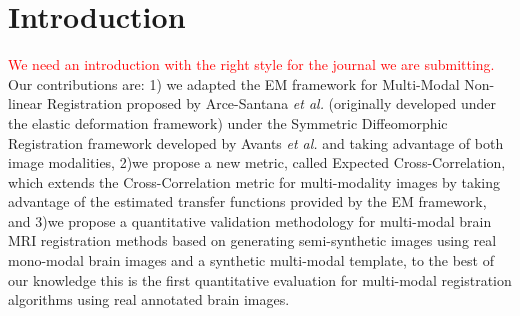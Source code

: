 \section{Introduction}
\textcolor{red}{We need an introduction with the right style for the journal we are submitting.}\\

Our contributions are: 1) we adapted the EM framework for Multi-Modal Non-linear Registration proposed by Arce-Santana {\it et al.}\cite{Arce-santana2014} (originally
developed under the elastic deformation framework) under the Symmetric Diffeomorphic Registration framework developed by Avants {\it et al.}\cite{Avants2008}
\cite{Avants2011} and taking advantage of both image modalities, 2)we propose a new metric, called Expected Cross-Correlation, which extends the Cross-Correlation metric for multi-modality images by taking
advantage of the estimated transfer functions provided by the EM framework, and 3)we propose a quantitative validation methodology for multi-modal brain MRI registration methods
based on generating semi-synthetic images using real mono-modal brain images and a synthetic multi-modal template, to the best of our knowledge this is the first
quantitative evaluation for multi-modal registration algorithms using real annotated brain images.
